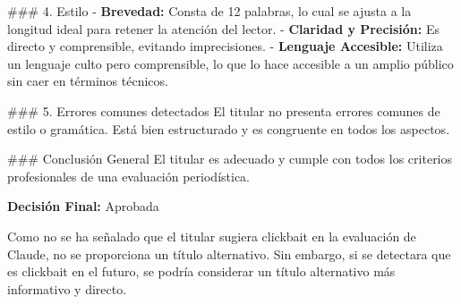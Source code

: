 \documentclass[10pt,a4paper]{article}
\begin{document}
\par\medskip
\#\#\# 4. Estilo - \textbf{Brevedad:} Consta de 12 palabras, lo cual se ajusta a la longitud ideal para retener la atenci\'{o}n del lector. - \textbf{Claridad y Precisi\'{o}n:} Es directo y comprensible, evitando imprecisiones. - \textbf{Lenguaje Accesible:} Utiliza un lenguaje culto pero comprensible, lo que lo hace accesible a un amplio p\'{u}blico sin caer en t\'{e}rminos t\'{e}cnicos.
\par\medskip
\#\#\# 5. Errores comunes detectados El titular no presenta errores comunes de estilo o gram\'{a}tica. Est\'{a} bien estructurado y es congruente en todos los aspectos.
\par\medskip
\#\#\# Conclusi\'{o}n General El titular es adecuado y cumple con todos los criterios profesionales de una evaluaci\'{o}n period\'{i}stica.
\par\medskip
\textbf{Decisi\'{o}n Final:} Aprobada
\par\medskip
Como no se ha se\~{n}alado que el titular sugiera clickbait en la evaluaci\'{o}n de Claude, no se proporciona un t\'{i}tulo alternativo. Sin embargo, si se detectara que es clickbait en el futuro, se podr\'{i}a considerar un t\'{i}tulo alternativo m\'{a}s informativo y directo.
        \vspace{1em}
\vspace{1em}

\end{document}
